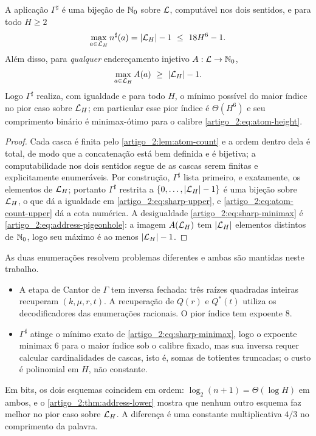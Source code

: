 \begin{theorem}\label{map:artigo_2:3.7}\label{artigo_2:thm:sharp-optimal}
A aplicação $\Gamma^\sharp$ é uma bijeção de $\mathbb{N}_0$ sobre $\mathcal{L}$, computável nos dois sentidos, e para todo $H\ge2$
\begin{equation}
 \max_{a\in\Library_H}n^\sharp(a)=|\Library_H|-1\ \le\ 18H^6-1 .
 \label{artigo_2:eq:sharp-upper}
\end{equation}
Além disso, para \emph{qualquer} endereçamento injetivo $A:\mathcal{L}\to\mathbb{N}_0$,
\begin{equation}
 \max_{a\in\mathcal{L}_H}A(a)\ \ge\ |\mathcal{L}_H|-1 .
 \label{artigo_2:eq:sharp-minimax}
\end{equation}
Logo $\Gamma^\sharp$ realiza, com igualdade e para todo $H$, o mínimo possível
do maior índice no pior caso sobre $\mathcal{L}_H$; em particular esse pior
índice é $\Theta(H^6)$ e seu comprimento binário é minimax-ótimo para o
calibre \eqref{artigo_2:eq:atom-height}.
\end{theorem}

\begin{proof}
Cada casca é finita pelo \cref{artigo_2:lem:atom-count} e a ordem dentro dela é total, de modo que a concatenação está bem definida e é bijetiva; a computabilidade nos dois sentidos segue de as cascas serem finitas e explicitamente enumeráveis. Por construção, $\Gamma^\sharp$ lista primeiro, e exatamente, os elementos de $\mathcal{L}_H$; portanto $\Gamma^\sharp$ restrita a $\{0,\ldots,|\mathcal{L}_H|-1\}$ é uma bijeção sobre $\mathcal{L}_H$, o que dá a igualdade em \eqref{artigo_2:eq:sharp-upper}, e \eqref{artigo_2:eq:atom-count-upper} dá a cota numérica. A desigualdade \eqref{artigo_2:eq:sharp-minimax} é \eqref{artigo_2:eq:address-pigeonhole}: a imagem $A(\mathcal{L}_H)$ tem $|\mathcal{L}_H|$ elementos distintos de $\mathbb{N}_0$, logo seu máximo é ao menos $|\mathcal{L}_H|-1$.
\end{proof}

\begin{remark}\label{map:artigo_2:3.8}\label{artigo_2:rem:which-address}
As duas enumerações resolvem problemas diferentes e ambas são mantidas neste trabalho.
\begin{itemize}[leftmargin=1.6em]
 \item A etapa de Cantor de $\Gamma$ tem inversa fechada: três raízes quadradas inteiras recuperam $(k,\mu,r,t)$. A recuperação de $Q(r)$ e $Q^*(t)$ utiliza os decodificadores das enumerações racionais. O pior índice tem expoente $8$.
 \item $\Gamma^\sharp$ atinge o mínimo exato de \eqref{artigo_2:eq:sharp-minimax}, logo o expoente minimax $6$ para o maior índice sob o calibre fixado, mas sua inversa requer calcular cardinalidades de cascas, isto é, somas de totientes truncadas; o custo é polinomial em $H$, não constante.
\end{itemize}
Em bits, os dois esquemas coincidem em ordem: $\log_2(n+1)=\Theta(\log H)$ em ambos, e o \cref{artigo_2:thm:address-lower} mostra que nenhum outro esquema faz melhor no pior caso sobre $\mathcal{L}_H$. A diferença é uma constante multiplicativa $4/3$ no comprimento da palavra.
\end{remark}

